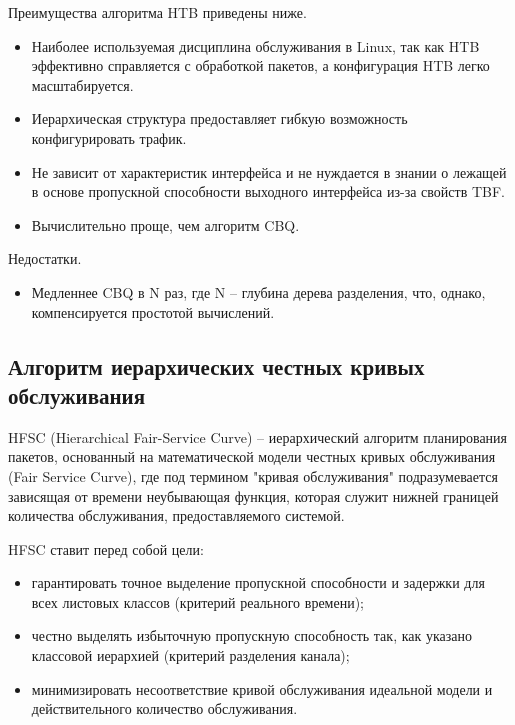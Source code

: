         Преимущества алгоритма HTB приведены ниже.
        \begin{itemize}
            \item Наиболее используемая дисциплина обслуживания в Linux, так как HTB эффективно
				  справляется с обработкой пакетов, а конфигурация HTB легко масштабируется.\cite{lartc}
            \item Иерархическая структура предоставляет гибкую возможность конфигурировать трафик.
            \item Не зависит от характеристик интерфейса и не нуждается в знании о лежащей в
                  основе пропускной способности выходного интерфейса из-за свойств TBF. \cite{tchtb}
            \item Вычислительно проще, чем алгоритм CBQ.\cite{htb}
        \end{itemize}

        Недостатки.
        \begin{itemize}
            \item Медленнее CBQ в N раз, где N -- глубина дерева разделения, что, однако, компенсируется простотой вычислений.\cite{htb}
        \end{itemize}

    \subsection{Алгоритм иерархических честных кривых обслуживания}

        HFSC (Hierarchical Fair-Service Curve) -- иерархический алгоритм планирования пакетов,
        основанный на математической модели честных кривых обслуживания (Fair Service Curve),
        где под термином "кривая обслуживания" подразумевается зависящая от времени
        неубывающая функция, которая служит нижней границей количества обслуживания,
        предоставляемого системой.\cite{hfsc}

        HFSC ставит перед собой цели:
        \begin{itemize}
            \item гарантировать точное выделение пропускной способности и задержки для всех листовых классов (критерий реального времени);
            \item честно выделять избыточную пропускную способность так, как указано классовой иерархией (критерий разделения канала);
            \item минимизировать несоответствие кривой обслуживания идеальной модели и действительного количество обслуживания.\cite{tchfsc}
        \end{itemize}

